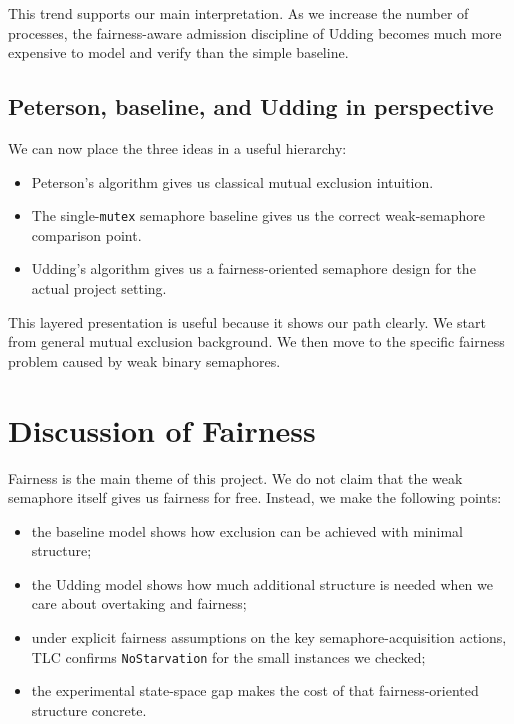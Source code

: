 \documentclass[11pt]{article}
\begin{document}
This trend supports our main interpretation. As we increase the number of processes, the fairness-aware admission discipline of Udding becomes much more expensive to model and verify than the simple baseline.

\subsection{Peterson, baseline, and Udding in perspective}

We can now place the three ideas in a useful hierarchy:

\begin{itemize}
  \item Peterson's algorithm gives us classical mutual exclusion intuition.
  \item The single-\texttt{mutex} semaphore baseline gives us the correct weak-semaphore comparison point.
  \item Udding's algorithm gives us a fairness-oriented semaphore design for the actual project setting.
\end{itemize}

This layered presentation is useful because it shows our path clearly. We start from general mutual exclusion background. We then move to the specific fairness problem caused by weak binary semaphores.

\section{Discussion of Fairness}

Fairness is the main theme of this project. We do not claim that the weak semaphore itself gives us fairness for free. Instead, we make the following points:

\begin{itemize}
  \item the baseline model shows how exclusion can be achieved with minimal structure;
  \item the Udding model shows how much additional structure is needed when we care about overtaking and fairness;
  \item under explicit fairness assumptions on the key semaphore-acquisition actions, TLC confirms \texttt{NoStarvation} for the small instances we checked;
  \item the experimental state-space gap makes the cost of that fairness-oriented structure concrete.
\end{itemize}
\end{document}
